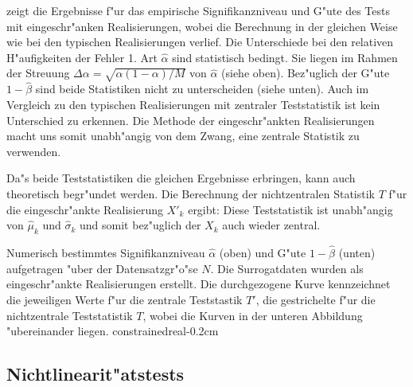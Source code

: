  zeigt die Ergebnisse f"ur das empirische Signifikanzniveau und G"ute des Tests
mit eingeschr"anken Realisierungen, wobei die Berechnung in der gleichen Weise
wie bei den typischen Realisierungen verlief. Die Unterschiede bei den relativen H"aufigkeiten der
Fehler 1. Art $\hat\alpha$ sind statistisch bedingt. Sie liegen im Rahmen der Streuung
$\Delta\alpha=\sqrt{\alpha(1-\alpha)/M}$ von $\hat\alpha$ (siehe  oben). Bez"uglich der G"ute
$1-\hat\beta$ sind beide Statistiken nicht zu unterscheiden (siehe  
unten). Auch im Vergleich zu den
typischen Realisierungen mit zentraler Teststatistik ist kein Unterschied zu erkennen.
Die Methode der eingeschr"ankten Realisierungen macht uns somit unabh"angig von dem Zwang,
eine zentrale Statistik zu verwenden.

Da"s beide Teststatistiken die gleichen Ergebnisse erbringen, kann auch theoretisch
begr"undet werden.  Die Berechnung der nichtzentralen Statistik $T$ f"ur die
eingeschr"ankte Realisierung $X'_k$ ergibt:
Diese Teststatistik ist unabh"angig von $\hat\mu_k$ und $\hat\sigma_k$ und somit
bez"uglich der $X_k$ auch wieder zentral. 

{Numerisch
   bestimmtes Signifikanzniveau $\hat\alpha$ (oben) und G"ute $1-\hat\beta$ (unten)
   aufgetragen "uber der Datensatzgr"o"se $N$. Die Surrogatdaten wurden als eingeschr"ankte
   Realisierungen erstellt. Die  durchgezogene Kurve kennzeichnet die jeweiligen Werte f"ur
   die zentrale Teststastik $T'$, die gestrichelte f"ur die nichtzentrale Teststatistik
   $T$, wobei die Kurven in der unteren Abbildung "ubereinander liegen.
}
{constrainedreal}{-0.2cm}


\subsection{Nichtlinearit"atstests}


